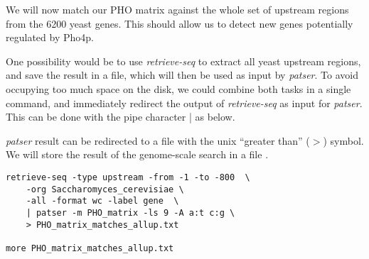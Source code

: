 We will now match our PHO matrix against the whole set of upstream
regions from the 6200 yeast genes. This should allow us to detect new
genes potentially regulated by Pho4p.

One possibility would be to use \textit{retrieve-seq} to extract all
yeast upstream regions, and save the result in a file, which will then
be used as input by \textit{patser}. To avoid occupying too much space
on the disk, we could combine both tasks in a single command, and
immediately redirect the output of \textit{retrieve-seq} as input for
\textit{patser}. This can be done with the pipe character | as
below.

\textit{patser} result can be redirected to a file with the unix
``greater than'' ($>$) symbol. We will store the result of the
genome-scale search in a file .

\begin{verbatim}
retrieve-seq -type upstream -from -1 -to -800  \
    -org Saccharomyces_cerevisiae \
    -all -format wc -label gene  \
    | patser -m PHO_matrix -ls 9 -A a:t c:g \
    > PHO_matrix_matches_allup.txt

more PHO_matrix_matches_allup.txt
\end{verbatim}
